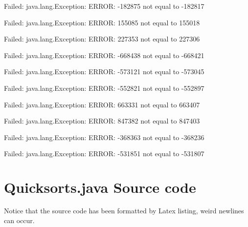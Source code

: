 Failed: java.lang.Exception: ERROR: -182875 not equal to -182817

Failed: java.lang.Exception: ERROR: 155085 not equal to 155018

Failed: java.lang.Exception: ERROR: 227353 not equal to 227306

Failed: java.lang.Exception: ERROR: -668438 not equal to -668421

Failed: java.lang.Exception: ERROR: -573121 not equal to -573045

Failed: java.lang.Exception: ERROR: -552821 not equal to -552897

Failed: java.lang.Exception: ERROR: 663331 not equal to 663407

Failed: java.lang.Exception: ERROR: 847382 not equal to 847403

Failed: java.lang.Exception: ERROR: -368363 not equal to -368236

Failed: java.lang.Exception: ERROR: -531851 not equal to -531807

\section{Quicksorts.java Source code}\label{quicksorts.java-source-code}

\label{sec:source_code} Notice that the source code has been formatted
by Latex listing, weird newlines can occur.


